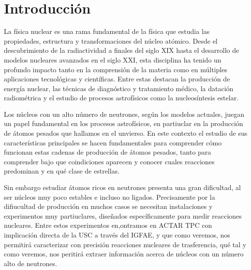 

\section{Introducción}


La física nuclear es una rama fundamental de la física que estudia las propiedades, estructura y transformaciones del núcleo atómico. Desde el descubrimiento de la radiactividad a finales del siglo XIX hasta el desarrollo de modelos nucleares avanzados en el siglo XXI, esta disciplina ha tenido un profundo impacto tanto en la comprensión de la materia como en múltiples aplicaciones tecnológicas y científicas. Entre estas destacan la producción de energía nuclear, las técnicas de diagnóstico y tratamiento médico, la datación radiométrica y el estudio de procesos astrofísicos como la nucleosíntesis estelar.

Los núcleos con un alto número de neutrones, según los modelos actuales, juegan un papel fundamental en los procesos astrofísicos, en partiuclar en la producción de átomos pesados que hallamos en el unvierso. En este contexto el estudio de sus características principales se hacen fundamentales para comprender cómo funcionan estas cadenas de producción de átomos pesados, tanto para comprender bajo que coindiciones aparecen y conocer cuales reacciones predominan y en qué clase de estrellas.

Sin embargo estudiar átomos ricos en neutrones presenta una gran dificultad, al ser núcleos muy poco estables e incluso no ligados. Precisamente por la difiucultad de producción en muchos casos se necesitan instalaciones y experimentos muy partiuclares, diseñados específicamente para medir reacciones nucleares. Entre estos experimentos en,ontramos en ACTAR TPC con implicación directa de la USC a través del IGFAE, y que como veremos, nos permitirá caracterizar con precisión reacciones nucleares de trasferencia, qué tal y como veremos, nos peritirá extraer información acerca de núcleos con un número alto de neutrones. 


